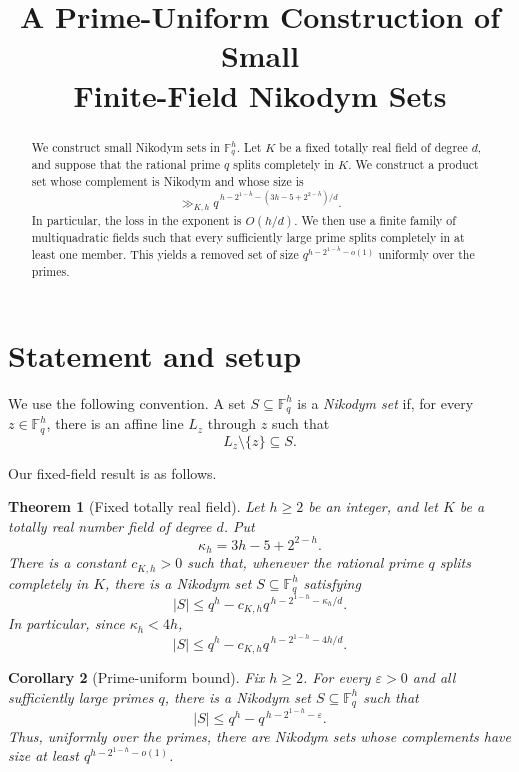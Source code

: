 \documentclass[11pt]{article}
\title{A Prime-Uniform Construction of Small\\Finite-Field Nikodym Sets}
\author{}
\date{}
\theoremstyle{plain}
\newtheorem{theorem}{Theorem}[section]
\newtheorem{corollary}[theorem]{Corollary}
\theoremstyle{remark}
\newcommand{\F}{\mathbb F}
\begin{document}
\maketitle

\begin{abstract}
We construct small Nikodym sets in $\F_q^h$.  Let $K$ be a fixed totally
real field of degree $d$, and suppose that the rational prime $q$ splits
completely in $K$.  We construct a product set whose complement is Nikodym
and whose size is
\[
  \gg_{K,h}q^{\,h-2^{1-h}-(3h-5+2^{2-h})/d}.
\]
In particular, the loss in the exponent is $O(h/d)$.  We then use a finite
family of multiquadratic fields such that every sufficiently large prime
splits completely in at least one member.  This yields a removed set of size
$q^{h-2^{1-h}-o(1)}$ uniformly over the primes.
\end{abstract}

\section{Statement and setup}

We use the following convention.  A set $S\subseteq\F_q^h$ is a
\emph{Nikodym set} if, for every $z\in\F_q^h$, there is an affine line
$L_z$ through $z$ such that
\[
  L_z\setminus\{z\}\subseteq S.
\]

Our fixed-field result is as follows.

\begin{theorem}[Fixed totally real field]\label{thm:fixed-field}
Let $h\geq2$ be an integer, and let $K$ be a totally real number field of
degree $d$.  Put
\[
  \kappa_h=3h-5+2^{2-h}.
\]
There is a constant $c_{K,h}>0$ such that, whenever the rational prime $q$
splits completely in $K$, there is a Nikodym set $S\subseteq\F_q^h$ satisfying
\begin{equation}\label{eq:sharp-fixed-bound}
  |S|\leq q^h-c_{K,h}q^{\,h-2^{1-h}-\kappa_h/d}.
\end{equation}
In particular, since $\kappa_h<4h$,
\begin{equation}\label{eq:fixed-bound}
  |S|\leq q^h-c_{K,h}q^{\,h-2^{1-h}-4h/d}.
\end{equation}
\end{theorem}

\begin{corollary}[Prime-uniform bound]\label{cor:uniform}
Fix $h\geq2$.  For every $\varepsilon>0$ and all sufficiently large primes
$q$, there is a Nikodym set $S\subseteq\F_q^h$ such that
\begin{equation}\label{eq:epsilon-bound}
  |S|\leq q^h-q^{\,h-2^{1-h}-\varepsilon}.
\end{equation}
Thus, uniformly over the primes, there are Nikodym sets whose complements
have size at least $q^{h-2^{1-h}-o(1)}$.
\end{corollary}
\end{document}
